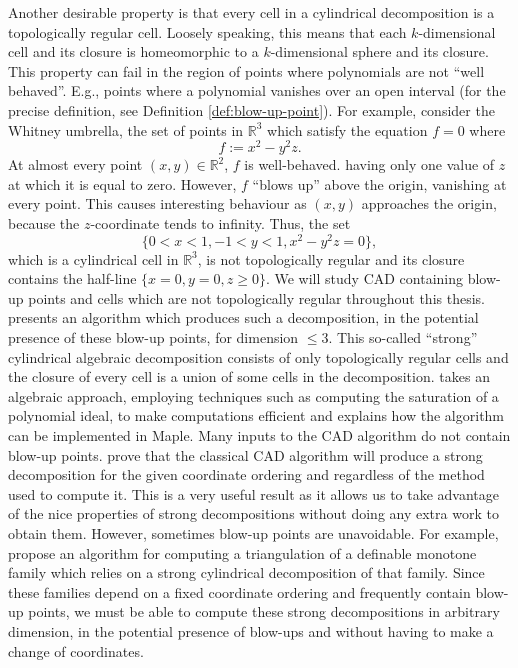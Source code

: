 \documentclass[
]{book}
\theoremstyle{definition}
\theoremstyle{definition}
\theoremstyle{definition}
\theoremstyle{definition}
\theoremstyle{remark}
\begin{document}
Another desirable property is that every cell in a cylindrical decomposition is a topologically regular cell. Loosely speaking, this means that each \(k\)-dimensional cell and its closure is homeomorphic to a \(k\)-dimensional sphere and its closure.
This property can fail in the region of points where polynomials are not ``well behaved''.
E.g., points where a polynomial vanishes over an open interval (for the precise definition, see Definition
\ref{def:blow-up-point}).
For example, consider the Whitney umbrella, the set of points in \(\mathbb{R}^3\) which satisfy the equation \(f = 0\) where
\[
f := x^2 - y^2 z.
\]
At almost every point \((x,y) \in \mathbb{R}^2\), \(f\) is well-behaved. having only one value of \(z\) at which it is equal to zero.
However, \(f\) ``blows up'' above the origin, vanishing at every point. This causes interesting behaviour as \((x,y)\) approaches the origin, because the \(z\)-coordinate tends to infinity. Thus, the set
\begin{equation}
\{ 0 < x < 1, -1 < y < 1, x^2 - y^2 z = 0 \},
\label{eq:basic-semialgebraic-whit}
\end{equation}
which is a cylindrical cell in \(\mathbb{R}^3\), is not topologically regular and its closure contains the half-line \(\{ x = 0, y = 0, z \ge 0 \}\).
We will study CAD containing blow-up points and cells which are not topologically regular throughout this thesis.
\citet{lazard10} presents an algorithm which produces such a decomposition, in the potential presence of these blow-up points, for dimension \(\le 3\). This so-called ``strong'' cylindrical algebraic decomposition consists of only topologically regular cells and the closure of every cell is a union of some cells in the decomposition. \citet{lazard10} takes an algebraic approach, employing techniques such as computing the saturation of a polynomial ideal, to make computations efficient and explains how the algorithm can be implemented in Maple.
Many inputs to the CAD algorithm do not contain blow-up points. \citet{jhd20} prove that the classical CAD algorithm will produce a strong decomposition for the given coordinate ordering and regardless of the method used to compute it. This is a very useful result as it allows us to take advantage of the nice properties of strong decompositions without doing any extra work to obtain them.
However, sometimes blow-up points are unavoidable. For example, \citet{bgv15} propose an algorithm for computing a triangulation of a definable monotone family which relies on a strong cylindrical decomposition of that family. Since these families depend on a fixed coordinate ordering and frequently contain blow-up points, we must be able to compute these strong decompositions in arbitrary dimension, in the potential presence of blow-ups and without having to make a change of coordinates.
\end{document}
